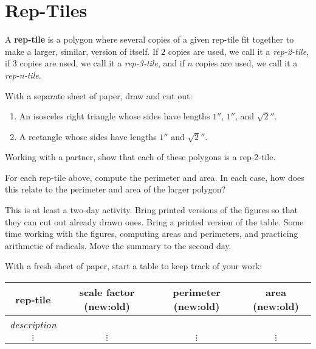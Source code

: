 \newpage
\section{Rep-Tiles}


A \textbf{rep-tile} is a polygon where several copies of
a given rep-tile fit together to make a larger, similar, version of
itself. If $2$ copies are used, we call it a \textit{rep-2-tile}, if
$3$ copies are used, we call it a \textit{rep-3-tile}, and if $n$ copies
are used, we call it a \textit{rep-n-tile}.


\begin{prob}
With a separate sheet of paper, draw and cut out:
\begin{enumerate}
\item An isosceles right triangle whose sides have lengths $1''$, $1''$, and $\sqrt{2}''$.
\item A rectangle whose sides have lengths $1''$ and $\sqrt{2}''$.
\end{enumerate}
Working with a partner, show that each of these polygons is a rep-2-tile.
\end{prob}

\begin{prob}
For each rep-tile above, compute the perimeter and area. In each case,
how does this relate to the perimeter and area of the larger polygon?
\end{prob}

\begin{teachingnote}
This is at least a two-day activity. Bring printed versions of the figures so that they can cut out already drawn ones. 
Bring a printed version of the table. 
Some time working with the figures, computing areas and perimeters, and practicing arithmetic of radicals.  Move the summary to the second day.
\end{teachingnote}

\begin{prob}
With a fresh sheet of paper, start a table to keep track of your work:  
\begin{center}
\begin{tabular}{c|c|c|c}
rep-tile & scale factor (new:old) &  perimeter (new:old) &  area (new:old)  \\ \hline\hline
\textit{description} &     &      &     \\ 
  $\vdots$    & $\vdots$  &  $\vdots$  &  $\vdots$ \\ 
\end{tabular}
\end{center}
\end{prob}


